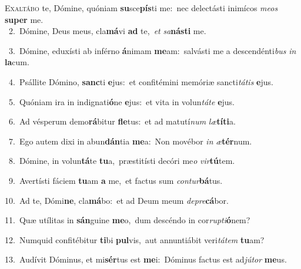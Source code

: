 \lettrine{\initial\textcolor{\initialcolor}{E}}{xaltábo} te, Dómine, quóniam \textbf{su}\-sce\-\textbf{pís}\-ti me:~\star nec delectásti inimícos \textit{me}\-\textit{os} \textbf{su}\-\textbf{per} me.\\
{\numbfont\textcolor{\numbcolor}{~2.}}~Dómine, Deus meus, cla\-\textbf{má}\-vi \textbf{ad} te,~\star \textit{et} \textit{sa}\-\textbf{nás}\textbf{ti} me.\par
{\numbfont\textcolor{\numbcolor}{~3.}}~Dómine, eduxísti ab inférno \textbf{á}\-nimam \textbf{me}\-am:~\star salvásti me a descendénti\textit{bus} \textit{in} \textbf{la}\-cum.\par
{\numbfont\textcolor{\numbcolor}{~4.}}~Psállite Dómino, \textbf{sanc}\-ti \textbf{e}\-jus:~\star et confitémini memóriæ sancti\-\textit{tá}\-\textit{tis} \textbf{e}\-jus.\par
{\numbfont\textcolor{\numbcolor}{~5.}}~Quóniam ira in indignati\-\textbf{ó}\-ne \textbf{e}\-jus:~\star et vita in volun\-\textit{tá}\-\textit{te} \textbf{e}\-jus.\par
{\numbfont\textcolor{\numbcolor}{~6.}}~Ad vésperum demo\-\textbf{rá}\-bitur \textbf{fle}\-tus:~\star et ad matutí\textit{num} \textit{læ}\-\textbf{tí}\textbf{ti}a.\par
{\numbfont\textcolor{\numbcolor}{~7.}}~Ego autem dixi in abun\-\textbf{dán}\-tia \textbf{me}\-a:~\star Non movébor \textit{in} \textit{æ}\-\textbf{tér}num.\par
{\numbfont\textcolor{\numbcolor}{~8.}}~Dómine, in volun\-\textbf{tá}\-te \textbf{tu}\-a,~\star præstitísti decóri me\textit{o} \textit{vir}\-\textbf{tú}tem.\par
{\numbfont\textcolor{\numbcolor}{~9.}}~Avertísti fáciem \textbf{tu}\-am \textbf{a} me,~\star et factus sum \textit{con}\-\textit{tur}\textbf{bá}tus.\par
{\numbfont\textcolor{\numbcolor}{10.}}~Ad te, Dómi\-\textbf{ne}\-, cla\-\textbf{má}\-bo:~\star et ad Deum meum \textit{de}\-\textit{pre}\textbf{cá}bor.\par
{\numbfont\textcolor{\numbcolor}{11.}}~Quæ utílitas in \textbf{sán}\-guine \textbf{me}\-o,~\star dum descéndo in cor\-\textit{rup}\-\textit{ti}\textbf{ó}nem?\par
{\numbfont\textcolor{\numbcolor}{12.}}~Numquid confitébitur \textbf{ti}\-bi \textbf{pul}\-vis,~\star aut annuntiábit veri\-\textit{tá}\-\textit{tem} \textbf{tu}\-am?\par
{\numbfont\textcolor{\numbcolor}{13.}}~Audívit Dóminus, et mi\-\textbf{sér}\-tus est \textbf{me}\-i:~\star Dóminus factus est ad\-\textit{jú}\-\textit{tor} \textbf{me}\-us.\par

